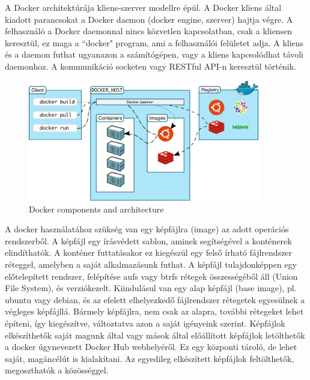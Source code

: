 \documentclass[a4paper]{article}
\begin{document}
A Docker architektúrája kliens-szerver modellre épül. A Docker kliens által kiadott parancsokat a Docker daemon (docker
engine, szerver) hajtja végre. A felhasználó a Docker daemonnal nincs közvetlen kapcsolatban, csak a kliensen
keresztül, ez maga a ``docker" program, ami a felhasználói felületet adja. A kliens és a daemon futhat ugyanazon a
számítógépen, vagy a kliens kapcsolódhat távoli daemonhoz. A kommunikáció socketen vagy RESTful API-n keresztül
történik.

\begin{figure}[H]
    \centering
    \includegraphics[width=0.9\textwidth]{figures/docker_arch.png}
    \caption{Docker components and architecture}
    \label{fig:arch}
\end{figure}

A docker használatához szükség van egy képfájlra (image) az adott operációs rendszerből. A képfájl egy írásvédett
sablon, aminek segítségével a konténerek elindíthatók. A konténer futtatásakor ez kiegészül egy felső írható
fájlrendszer réteggel, amelyben a saját alkalmazásunk futhat. A képfájl tulajdonképpen egy előtelepített rendszer,
felépítése aufs vagy btrfs rétegek összességéből áll (Union File System), és verziókezelt. Kiindulásul van egy alap
képfájl (base image), pl. ubuntu vagy debian, és az efelett elhelyezkedő fájlrendszer rétegetek egyesülnek a végleges
képfájllá. Bármely képfájlra, nem csak az alapra, további rétegeket lehet építeni, így kiegészítve, változtatva azon a
saját igényeink szerint. Képfájlok elkészíthetők saját magunk által vagy mások által előállított képfájlok letölthetők
a docker úgynevezett Docker Hub webhelyéről. Ez egy központi tároló, de lehet saját, magáncélút is kialakítani. Az
egyedileg elkészített képfájlok feltölthetők, megoszthatók a közösséggel.
\end{document}

